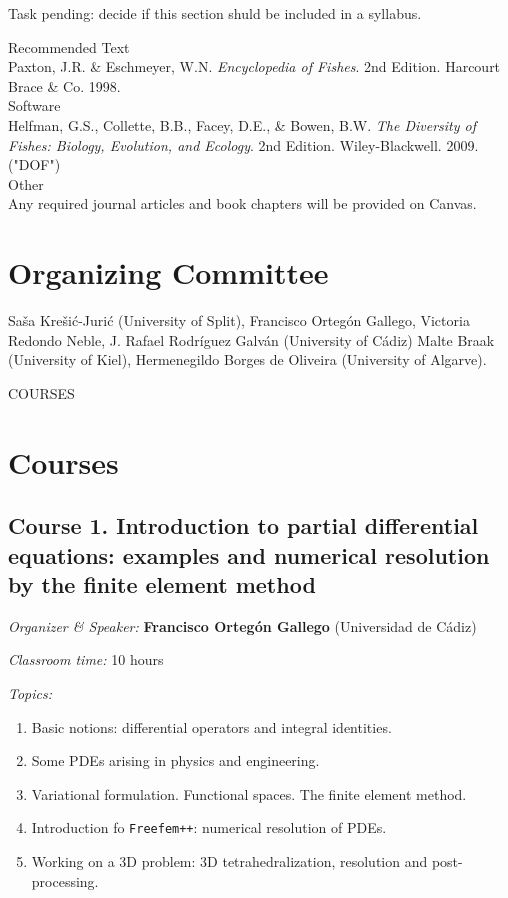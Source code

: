 \documentclass[letterpaper]{inzane_syllabus} %
\begin{document}
Task pending: decide if this section shuld be included in a syllabus.

{\color{myCOLOR} Recommended Text}\\
Paxton, J.R. \& Eschmeyer, W.N. \textit{Encyclopedia of Fishes}. 2nd Edition. Harcourt Brace \& Co. 1998. \\

{\color{myCOLOR} Software}\\
Helfman, G.S., Collette, B.B., Facey, D.E., \& Bowen, B.W. \textit{The Diversity of Fishes: Biology, Evolution, and Ecology}. 2nd Edition. Wiley-Blackwell. 2009. ("DOF") \\

{\color{myCOLOR} Other}\\
Any required journal articles and book chapters will be provided on Canvas. 


\vspace{0.5cm}
\section{Organizing Committee}

Saša Krešić-Jurić (University of Split), Francisco Ortegón Gallego, Victoria Redondo Neble, J. Rafael Rodríguez Galván (University of Cádiz) Malte Braak (University of Kiel), Hermenegildo Borges de Oliveira (University of Algarve). 

                COURSES
\newpage
\makeFullPage

\newcommand{\block}[3]{\par\textit{#1:} \textbf{#2} #3}

\section{Courses}

\subsection{Course 1. Introduction to partial differential equations: examples and numerical resolution by the finite element method}
\block{Organizer \& Speaker}{Francisco Ortegón Gallego}{(Universidad de Cádiz)}
\block{Classroom time}{}{10 hours}
\block{Topics}{}{}
\begin{enumerate}
  \item Basic notions: differential operators and integral identities. 
  \item Some PDEs arising in physics and engineering.
  \item Variational formulation. Functional spaces. The finite element method.
  \item Introduction fo \texttt{Freefem++}: numerical resolution of PDEs.
  \item Working on a 3D problem: 3D tetrahedralization, resolution and 
  post-processing.
\end{enumerate} 
\end{document}
